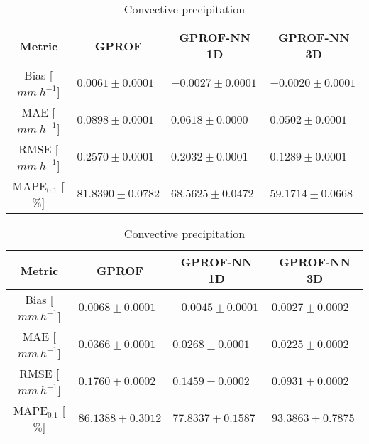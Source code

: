 \documentclass[a4paper,11pt,bibtotoc]{scrartcl}
\begin{document}
\begin{table}[hbpt!]
  \centering
  \caption{
    Same as Tab.~\ref{tab:metrics_gmi} but for the MHS sensor.
  }
  \label{tab:metrics_mhs}
\begin{subtable}{\textwidth} 
 \caption{Surface precipitation} 
\begin{tabular}{|c||p{3.5cm}|p{3.5cm}|p{3.5cm}|}
\hline
Metric &
\multicolumn{1}{|c}{GPROF} &
\multicolumn{1}{|c}{GPROF-NN 1D} &
\multicolumn{1}{|c|}{GPROF-NN 3D} \\
\hline\hline
Bias \hfill [$\unit{mm\ h^{-1}}$] & \hfill $  0.0061 \pm 0.0001$ &\hfill $ -0.0027 \pm 0.0001$ &\hfill $ -0.0020 \pm 0.0001$ \\
MAE \hfill [$\unit{mm\ h^{-1}}$] & \hfill $  0.0898 \pm 0.0001$ &\hfill $  0.0618 \pm 0.0000$ &\hfill $  0.0502 \pm 0.0001$ \\
RMSE \hfill [$\unit{mm\ h^{-1}}$] & \hfill $  0.2570 \pm 0.0001$ &\hfill $  0.2032 \pm 0.0001$ &\hfill $  0.1289 \pm 0.0001$ \\
MAPE$_{0.1}$ \hfill [$\unit{\%}$] & \hfill $ 81.8390 \pm 0.0782$ &\hfill $ 68.5625 \pm 0.0472$ &\hfill $ 59.1714 \pm 0.0668$ \\
\hline
\end{tabular}
\end{subtable}

\begin{subtable}{\textwidth} 
 \caption{Convective precipitation} 
\begin{tabular}{|c||p{3.5cm}|p{3.5cm}|p{3.5cm}|}
\hline
Metric &
\multicolumn{1}{|c}{GPROF} &
\multicolumn{1}{|c}{GPROF-NN 1D} &
\multicolumn{1}{|c|}{GPROF-NN 3D} \\
\hline\hline
Bias \hfill [$\unit{mm\ h^{-1}}$] & \hfill $  0.0068 \pm 0.0001$ &\hfill $ -0.0045 \pm 0.0001$ &\hfill $  0.0027 \pm 0.0002$ \\
MAE \hfill [$\unit{mm\ h^{-1}}$] & \hfill $  0.0366 \pm 0.0001$ &\hfill $  0.0268 \pm 0.0001$ &\hfill $  0.0225 \pm 0.0002$ \\
RMSE \hfill [$\unit{mm\ h^{-1}}$] & \hfill $  0.1760 \pm 0.0002$ &\hfill $  0.1459 \pm 0.0002$ &\hfill $  0.0931 \pm 0.0002$ \\
MAPE$_{0.1}$ \hfill [$\unit{\%}$] & \hfill $ 86.1388 \pm 0.3012$ &\hfill $ 77.8337 \pm 0.1587$ &\hfill $ 93.3863 \pm 0.7875$ \\
\hline
\end{tabular}
\end{subtable}


\end{table}
\end{document}
